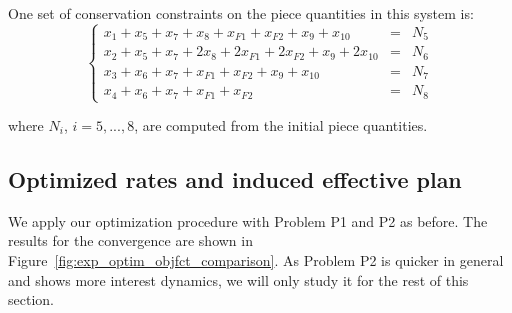 
	One set of conservation constraints on the piece quantities in this system is:
	\begin{equation}\label{eq:consExp}
		\left\lbrace\begin{array}{lll}
			x_1+x_5+x_7+x_8+x_{F1}+x_{F2}+x_{9}+x_{10} &=& N_5 \\
			x_2+x_5+x_7+2 x_8+2 x_{F1}+2 x_{F2}+x_{9}+2 x_{10} &=& N_6 \\
			x_3+x_6+x_7+x_{F1}+x_{F2}+x_{9}+x_{10} &=& N_7\\
			x_4 + x_6 + x_7 + x_{F1} + x_{F2} &=& N_8 
		\end{array}
		\right.
	\end{equation}
	
	where $N_i$, $i=5,...,8$, are computed from the initial piece
	quantities.
	
	\subsection{Optimized rates and induced effective plan} %
	\label{sub:optimized_rates}
		We apply our optimization procedure with Problem P1 and P2 as before. The results for the convergence are shown in Figure~\ref{fig:exp_optim_objfct_comparison}. As Problem P2 is quicker in general and shows more interest dynamics, we will only study it for the rest of this section.
		
